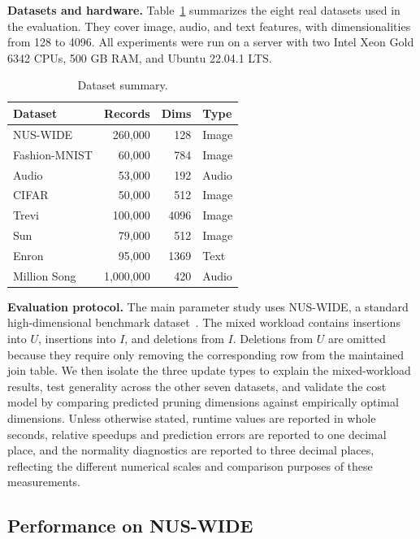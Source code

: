 \noindent\textbf{Datasets and hardware.}
Table~\ref{tab:dataset} summarizes the eight real datasets used in the evaluation. They cover image, audio, and text features, with dimensionalities from 128 to 4096. All experiments were run on a server with two Intel Xeon Gold 6342 CPUs, 500 GB RAM, and Ubuntu 22.04.1 LTS.

\begin{table}[t]
\centering
\caption{Dataset summary.}
\label{tab:dataset}
\begin{tabular*}{\columnwidth}{@{\extracolsep{\fill}}lrrl@{}}
\toprule
\textbf{Dataset} & \textbf{Records} & \textbf{Dims} & \textbf{Type}\\
\midrule
NUS-WIDE & 260,000 & 128 & Image\\
Fashion-MNIST & 60,000 & 784 & Image\\
Audio & 53,000 & 192 & Audio\\
CIFAR & 50,000 & 512 & Image\\
Trevi & 100,000 & 4096 & Image\\
Sun & 79,000 & 512 & Image\\
Enron & 95,000 & 1369 & Text\\
Million Song & 1,000,000 & 420 & Audio\\
\bottomrule
\end{tabular*}
\end{table}

\noindent\textbf{Evaluation protocol.}
The main parameter study uses NUS-WIDE, a standard high-dimensional benchmark dataset~\cite{hussain2024gradual}. The mixed workload contains insertions into $U$, insertions into $I$, and deletions from $I$. Deletions from $U$ are omitted because they require only removing the corresponding row from the maintained join table. We then isolate the three update types to explain the mixed-workload results, test generality across the other seven datasets, and validate the cost model by comparing predicted pruning dimensions against empirically optimal dimensions. Unless otherwise stated, runtime values are reported in whole seconds, relative speedups and prediction errors are reported to one decimal place, and the normality diagnostics are reported to three decimal places, reflecting the different numerical scales and comparison purposes of these measurements.

\subsection{Performance on NUS-WIDE}

